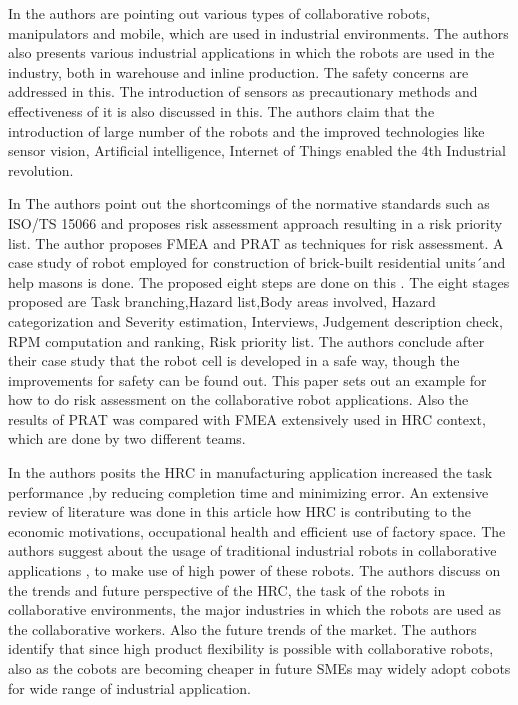 {In\cite{author4} the authors are pointing out various types of collaborative robots, manipulators and mobile, which are used in industrial environments. The authors also presents various industrial applications in which the robots are used in the industry, both in warehouse and inline production. The safety concerns are addressed in this. The introduction of sensors as precautionary methods and effectiveness of it is also discussed in this. The authors claim that the introduction of large number of the robots and the improved technologies like sensor vision, Artificial intelligence, Internet of Things enabled the 4th Industrial revolution.

In \cite{author5} The authors point out the shortcomings of the normative standards such as ISO/TS 15066 and proposes risk assessment approach resulting in a risk priority list. The author proposes FMEA and PRAT as techniques for risk assessment. A case study of robot employed for construction of brick-built residential units´and help masons is done. The proposed  eight steps are done on this . The eight stages proposed are Task branching,Hazard list,Body areas involved, Hazard categorization and Severity estimation, Interviews, Judgement description check, RPM computation and ranking, Risk priority list. The authors conclude after their case study that the robot cell is developed in a safe way, though the improvements for safety can be found out. This paper sets out an example for how to do risk assessment on the collaborative robot applications. Also the results of PRAT was compared with FMEA extensively used in HRC context, which are done by two different teams. 

In\cite{author6} the authors posits the HRC in manufacturing application increased the task performance ,by reducing completion time and minimizing error. An extensive review of literature was done in this article how HRC is contributing to the economic motivations, occupational health and efficient use of factory space. The authors suggest about the usage of traditional industrial robots in collaborative applications , to make use of high power of these robots. The authors discuss on the trends and future perspective of the HRC, the task of the robots in collaborative environments, the major industries in which the robots are used as the collaborative workers. Also the future trends of the market. The authors identify that since high product flexibility is possible with collaborative robots, also as the cobots are becoming cheaper in future SMEs may widely adopt cobots for wide range of industrial application.

}
